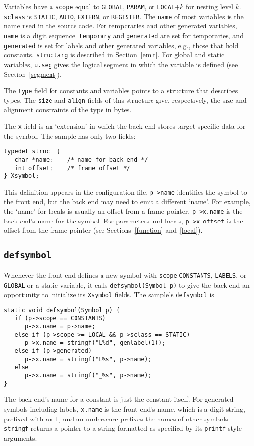 Variables have a \verb|scope| equal to \verb|GLOBAL|, \verb|PARAM|,
or \verb|LOCAL|$+k$ for nesting level $k$.
\verb|sclass| is \verb|STATIC|, \verb|AUTO|, \verb|EXTERN|, or \verb|REGISTER|.
The \verb|name| of most variables is the name used in the source code.
For temporaries and other generated variables, \verb|name| is a digit sequence.
\verb|temporary| and \verb|generated| are set for temporaries,
and \verb|generated| is set for labels and other generated variables, e.g., those
that hold constants.
\verb|structarg| is described in Section~\ref{emit}.
For global and static variables,
\verb|u.seg| gives the logical segment in which the variable is defined
(see Section~\ref{segment}).

The \verb|type| field for constants and variables points to
a structure that describes types. The \verb|size| and \verb|align|
fields of this structure give, respectively, the size and alignment constraints
of the type in bytes.

The \verb|x| field is an `extension' in which the back end stores
target-specific data for the symbol.
The sample has only two fields:
\begin{verbatim}
typedef struct {
   char *name;    /* name for back end */
   int offset;    /* frame offset */
} Xsymbol;
\end{verbatim}
This definition appears in the configuration file.
\verb|p->name| identifies the symbol to the front end, but the back end
may need to emit a different `name'. For example,
the `name' for locals is usually an offset from a frame pointer.
\verb|p->x.name| is the back end's name for the symbol.
For parameters and locals, \verb|p->x.offset| is the
offset from the frame pointer (see Sections~\ref{function} and~\ref{local}).

\subsection{\tt defsymbol}

\label{defsymbol}
Whenever the front end defines a new symbol with
\verb|scope| \verb|CONSTANTS|, \verb|LABELS|, or \verb|GLOBAL|
or a static variable, it calls
\verb|defsymbol(Symbol p)| to give the back end an opportunity to initialize
its \verb|Xsymbol| fields. The sample's \verb|defsymbol| is
\begin{verbatim}
static void defsymbol(Symbol p) {
   if (p->scope == CONSTANTS)
      p->x.name = p->name;
   else if (p->scope >= LOCAL && p->sclass == STATIC)
      p->x.name = stringf("L%d", genlabel(1));
   else if (p->generated)
      p->x.name = stringf("L%s", p->name);
   else
      p->x.name = stringf("_%s", p->name);
}
\end{verbatim}
The back end's name for a constant is just the constant itself.
For generated symbols including labels, \verb|x.name| is the front end's name,
which is a digit string, prefixed with an \verb|L|,
and an underscore prefixes the names of other symbols.
\verb|stringf| returns a pointer to a string formatted as specified
by its \verb|printf|-style arguments.

